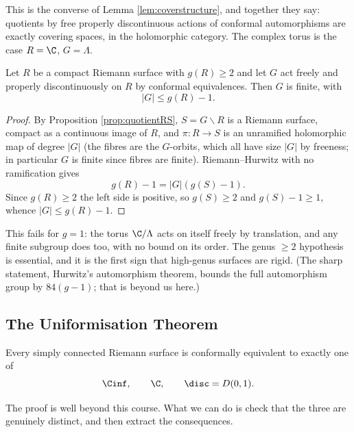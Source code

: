 This is the converse of Lemma \ref{lem:coverstructure}, and together they say: quotients
by free properly discontinuous actions of conformal automorphisms are exactly covering
spaces, in the holomorphic category. The complex torus is the case $R = \C$,
$G = \Lambda$.

\begin{theorem}\label{thm:hurwitzbound}
	Let $R$ be a compact Riemann surface with $g(R) \geq 2$ and let $G$ act freely and
	properly discontinuously on $R$ by conformal equivalences. Then $G$ is finite, with
	$$
	|G| \leq g(R) - 1.
	$$
\end{theorem}

\begin{proof}
	By Proposition \ref{prop:quotientRS}, $S = G\backslash R$ is a Riemann surface, compact
	as a continuous image of $R$, and $\pi : R \to S$ is an unramified holomorphic map of
	degree $|G|$ (the fibres are the $G$-orbits, which all have size $|G|$ by freeness; in
	particular $G$ is finite since fibres are finite). Riemann--Hurwitz with no ramification
	gives
	$$
	g(R) - 1 = |G|\left(g(S)-1\right).
	$$
	Since $g(R)\geq 2$ the left side is positive, so $g(S)\geq 2$ and $g(S)-1\geq1$, whence
	$|G| \leq g(R)-1$.
\end{proof}

\begin{remark}
	This fails for $g = 1$: the torus $\C/\Lambda$ acts on itself freely by translation, and
	any finite subgroup does too, with no bound on its order. The genus $\geq 2$ hypothesis
	is essential, and it is the first sign that high-genus surfaces are rigid. (The sharp
	statement, Hurwitz's automorphism theorem, bounds the full automorphism group by
	$84(g-1)$; that is beyond us here.)
\end{remark}

\subsection{The Uniformisation Theorem}

\begin{theorem}\label{thm:uniformisation}
	Every simply connected Riemann surface is conformally equivalent to exactly one of
	$$
	\Cinf, \qquad \C, \qquad \disc = D(0,1).
	$$
\end{theorem}

The proof is well beyond this course. What we can do is check that the three are genuinely
distinct, and then extract the consequences.

